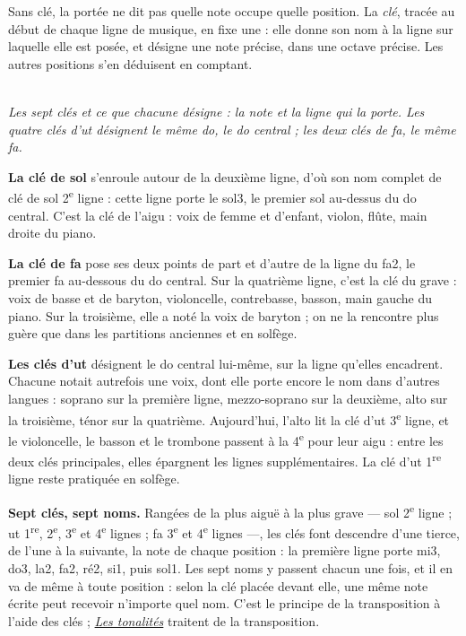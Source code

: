 \documentclass[a4paper,11pt]{article}
\newcommand{\legende}[1]{\\[4pt]{\small\itshape\color{mygray} #1}}
\begin{document}
Sans clé, la portée ne dit pas quelle note occupe quelle position. La
\emph{clé}, tracée au début de chaque ligne de musique, en fixe une : elle
donne son nom à la ligne sur laquelle elle est posée, et désigne une note
précise, dans une octave précise. Les autres positions s'en déduisent en
comptant.

\par\medskip\noindent
\begin{minipage}{\linewidth}
\centering

\legende{Les sept clés et ce que chacune désigne : la note et la ligne qui la
porte. Les quatre clés d'ut désignent le même do, le do central ; les deux clés
de fa, le même fa.}
\end{minipage}\par\medskip

\textbf{La clé de sol} s'enroule autour de la deuxième ligne, d'où son nom
complet de clé de sol 2\textsuperscript{e} ligne : cette ligne porte le sol3,
le premier sol au-dessus du do central. C'est la clé de l'aigu : voix de femme
et d'enfant, violon, flûte, main droite du piano.

\textbf{La clé de fa} pose ses deux points de part et d'autre de la ligne du
fa2, le premier fa au-dessous du do central. Sur la quatrième ligne, c'est la
clé du grave : voix de basse et de baryton, violoncelle, contrebasse, basson,
main gauche du piano. Sur la troisième, elle a noté la voix de baryton ; on ne
la rencontre plus guère que dans les partitions anciennes et en solfège.

\textbf{Les clés d'ut} désignent le do central lui-même, sur la ligne qu'elles
encadrent. Chacune notait autrefois une voix, dont elle porte encore le nom dans
d'autres langues : soprano sur la première ligne, mezzo-soprano sur la
deuxième, alto sur la troisième, ténor sur la quatrième. Aujourd'hui, l'alto
lit la clé d'ut 3\textsuperscript{e} ligne, et le violoncelle, le basson et le
trombone passent à la 4\textsuperscript{e} pour leur aigu : entre les deux
clés principales, elles épargnent les lignes supplémentaires. La clé d'ut
1\textsuperscript{re} ligne reste pratiquée en solfège.

\textbf{Sept clés, sept noms.} Rangées de la plus aiguë à la plus grave ---
sol 2\textsuperscript{e} ligne ; ut 1\textsuperscript{re},
2\textsuperscript{e}, 3\textsuperscript{e} et 4\textsuperscript{e} lignes ;
fa 3\textsuperscript{e} et 4\textsuperscript{e} lignes ---, les clés font
descendre d'une tierce, de l'une à la suivante, la note de chaque position : la
première ligne porte mi3, do3, la2, fa2, ré2, si1, puis sol1. Les sept noms y
passent chacun une fois, et il en va de même à toute position : selon la clé
placée devant elle, une même note écrite peut recevoir n'importe quel nom.
C'est le principe de la transposition à l'aide des clés ;
\href{https://www.slashbin.net/musique/theorie/tonalites.pdf}{\emph{Les
tonalités}} traitent de la transposition.
\end{document}
